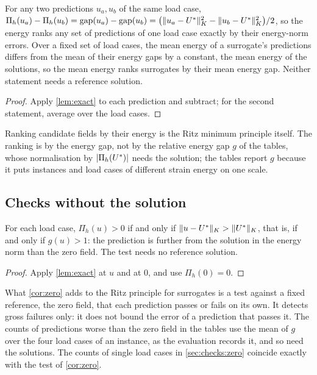 \begin{corollary}\label{cor:rank}
For any two predictions $u_a,u_b$ of the same load case,
$\Pi_h(u_a)-\Pi_h(u_b)=\operatorname{gap}(u_a)-\operatorname{gap}(u_b)
=\bigl(\lVert u_a-U^{\ast}\rVert_K^2-\lVert u_b-U^{\ast}\rVert_K^2\bigr)/2$, so the energy ranks
any set of predictions of one load case exactly by their energy-norm errors. Over a
fixed set of load cases, the mean energy of a surrogate's predictions differs from the mean
of their energy gaps by a constant, the mean energy of the solutions, so the mean energy
ranks surrogates by their mean energy gap. Neither statement needs a reference solution.
\end{corollary}

\begin{proof}
Apply \cref{lem:exact} to each prediction and subtract; for the second statement, average
over the load cases.
\end{proof}

Ranking candidate fields by their energy is the Ritz minimum principle itself. The ranking
is by the energy gap, not by the relative energy gap $g$ of the tables, whose normalisation
by $\lvert\Pi_h(U^{\ast})\rvert$ needs the solution; the tables report $g$ because it puts
instances and load cases of different strain energy on one scale.

\subsection{Checks without the solution}\label{sec:theory:detector}

\begin{corollary}\label{cor:zero}
For each load case, $\Pi_h(u)>0$ if and only if $\lVert u-U^{\ast}\rVert_K>\lVert U^{\ast}\rVert_K$, that
is, if and only if $g(u)>1$: the prediction is further from the solution in the energy
norm than the zero field. The test needs no reference solution.
\end{corollary}

\begin{proof}
Apply \cref{lem:exact} at $u$ and at $0$, and use $\Pi_h(0)=0$.
\end{proof}

What \cref{cor:zero} adds to the Ritz principle for surrogates is a test against a fixed
reference, the zero field, that each prediction passes or fails on its own. It detects
gross failures only: it does not bound the error of a prediction that passes it. The counts
of predictions worse than the zero field in the tables use the mean of $g$ over the four
load cases of an instance, as the evaluation records it, and so need the solutions. The counts of single load cases in
\cref{sec:checks:zero} coincide exactly with the test of
\cref{cor:zero}.

